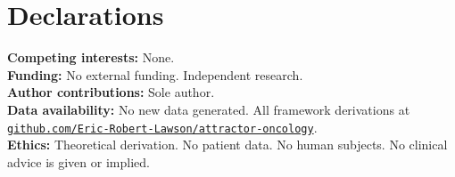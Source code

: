 \documentclass[12pt,a4paper]{article}
\begin{document}
\section*{Declarations}

\noindent\textbf{Competing interests:} None.\\
\textbf{Funding:} No external funding. Independent research.\\
\textbf{Author contributions:} Sole author.\\
\textbf{Data availability:} No new data generated. All
framework derivations at
\href{https://github.com/Eric-Robert-Lawson/attractor-oncology}%
{\texttt{github.com/Eric-Robert-Lawson/attractor-oncology}}.\\
\textbf{Ethics:} Theoretical derivation. No patient data.
No human subjects. No clinical advice is given or implied.
\end{document}
